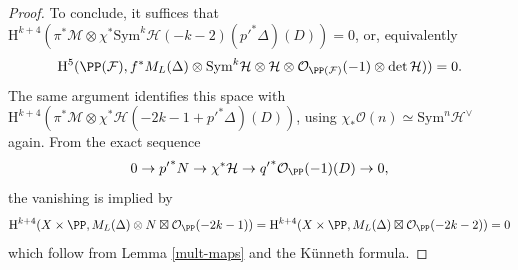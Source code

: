 \begin{proof}
To conclude, it suffices that $\mathrm{H}^{k+4}(\pi^* \mathcal{M} \otimes  \chi^* \mathrm{Sym}^{k} \mathcal{H} (-k-2)({p'}^*\Delta)(D))=0$, or, equivalently
$$\mathrm{H}^5(\PP(\mathcal{F}),f^*M_L(\Delta) \otimes \mathrm{Sym}^k\mathcal{H} \otimes \mathcal{H} \otimes \mathcal{O}_{\PP(\mathcal{F})}(-1)\otimes \det \mathcal{H}))=0.$$
The same argument identifies this space with $\mathrm{H}^{k+4}(\pi^* \mathcal{M} \otimes \chi^*\mathcal{H} (-2k-1+{p'}^*\Delta)(D))$, using $\chi_*\mathcal{O}(n)\simeq \mathrm{Sym}^n\mathcal{H}^{\vee}$ again. From the exact sequence
$$0 \to {p'}^*N \to \chi^* \mathcal{H} \to {q'}^*\mathcal{O}_{\PP}(-1)(D) \to 0,$$
the vanishing is implied by
{\small{\begin{align*}
\mathrm{H}^{k+4}(X \times \PP, M_L(\Delta) \otimes N \boxtimes \mathcal{O}_{\PP}(-2k-1))=\mathrm{H}^{k+4}(X \times \PP, M_L(\Delta)\boxtimes \mathcal{O}_{\PP}(-2k-2))=0
\end{align*}}}
which follow from Lemma \ref{mult-maps} and the K\"unneth formula.
\end{proof}

